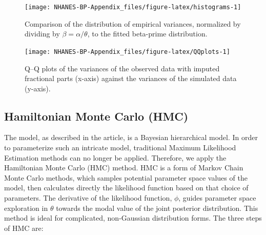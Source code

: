 \documentclass[
]{article}
\begin{document}
\begin{landscape}
\begin{figure}

{\centering \texttt{[image: NHANES-BP-Appendix\_files/figure-latex/histograms-1]} 

}

\caption{Comparison of the distribution of empirical variances, normalized by dividing by $\beta=\alpha/\theta$, to the fitted beta-prime distribution.}\label{fig:histograms}
\end{figure}

\end{landscape}

\begin{figure}

{\centering \texttt{[image: NHANES-BP-Appendix\_files/figure-latex/QQplots-1]} 

}

\caption{Q--Q plots of the variances of the observed data with imputed fractional parts (x-axis) against the variances of the simulated data (y-axis).}\label{fig:QQplots}
\end{figure}

\subsection{Hamiltonian Monte Carlo (HMC)}\label{hamiltonian-monte-carlo-hmc}

The model, as described in the article, is a Bayesian hierarchical model. In order to parameterize such an intricate model, traditional Maximum Likelihood Estimation methods can no longer be applied. Therefore, we apply the Hamiltonian Monte Carlo (HMC) method. HMC is a form of Markov Chain Monte Carlo methods, which samples potential parameter space values of the model, then calculates directly the likelihood function based on that choice of parameters. The derivative of the likelihood function, \(\phi\), guides parameter space exploration in \(\theta\) towards the modal value of the joint posterior distribution. This method is ideal for complicated, non-Gaussian distribution forms. The three steps of HMC are:
\end{document}
